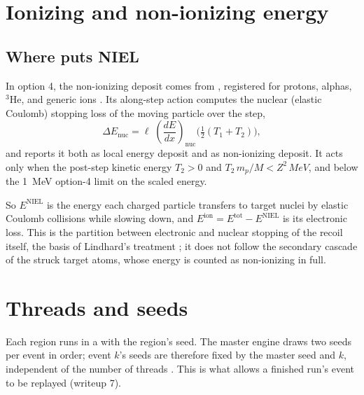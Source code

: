 \section{Ionizing and non-ionizing energy}

\subsection{Where \gfour{} puts NIEL}
In option 4, the non-ionizing deposit comes from , registered for protons, alphas, $^3$He, and generic ions \citep{g4source}. Its along-step action computes the nuclear (elastic Coulomb) stopping loss of the moving particle over the step,
\[
  \Delta E_\text{nuc} = \ell\;\left(\frac{dE}{dx}\right)_\text{nuc}\!\big(\tfrac12(T_1+T_2)\big),
\]
and reports it both as local energy deposit and as non-ionizing deposit. It acts only when the post-step kinetic energy $T_2>0$ and $T_2\,m_p/M < Z^2\,\si{MeV}$, and below the \SI{1}{MeV} option-4 limit on the scaled energy.

So $E^{\text{NIEL}}$ is the energy each charged particle transfers to target nuclei by elastic Coulomb collisions while slowing down, and $E^{\text{ion}}=E^{\text{tot}}-E^{\text{NIEL}}$ is its electronic loss. This is the partition between electronic and nuclear stopping of the recoil itself, the basis of Lindhard's treatment \citep{lindhard1963integral}; it does not follow the secondary cascade of the struck target atoms, whose energy is counted as non-ionizing in full.


\section{Threads and seeds}
Each region runs in a  with the region's seed. The master engine draws two seeds per event in order; event $k$'s seeds are therefore fixed by the master seed and $k$, independent of the number of threads \citep{g4source,g4appdev}. This is what allows a finished run's event to be replayed (writeup 7).



